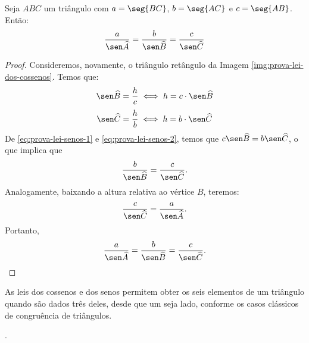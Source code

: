 \begin{theorem}
    Seja $ABC$ um triângulo com $a = \seg {BC}$, $b = \seg {AC}$ e $c = \seg
{AB}$. Então:
$$\frac a {\sen \widehat A} = \frac b {\sen \widehat B} = \frac c {\sen \widehat C}$$
\end{theorem}

\begin{proof}
    Consideremos, novamente, o triângulo retângulo da Imagem \ref{img:prova-lei-dos-cossenos}. %
    Temos que:
    \begin{equation}
    \label{eq:prova-lei-senos-1}
        \sen \widehat B = \frac h c \iff h = c \cdot \sen \widehat B
    \end{equation}
    \begin{equation}
    \label{eq:prova-lei-senos-2}
        \sen \widehat C = \frac h b \iff h = b \cdot \sen \widehat C
    \end{equation}
    De \ref{eq:prova-lei-senos-1} e \ref{eq:prova-lei-senos-2}, temos que $c \sen \widehat B = b \sen \widehat C$,
    o que implica que $$\frac b {\sen \widehat B} = \frac c {\sen \widehat C}.$$ Analogamente, 
    baixando a altura relativa ao vértice $B$, teremos: $$ \frac c {\sen \widehat C} = \frac a {\sen \widehat A}.$$
    Portanto, $$\frac a {\sen \widehat A} = \frac b {\sen \widehat B} = \frac c {\sen \widehat C}.$$
\end{proof}

As leis dos cossenos e dos senos permitem obter os seis elementos de
um triângulo quando são dados três deles, desde que um seja lado,
conforme os casos clássicos de congruência de triângulos.

\begin{onlineact}
    .
\end{onlineact}